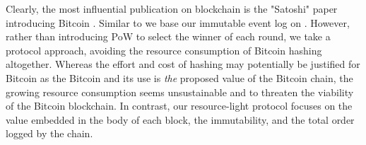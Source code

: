 \documentclass[10pt]{article}
\begin{document}

Clearly, the most influential publication on blockchain is the "Satoshi" paper introducing Bitcoin \cite{satoshi-paper}. Similar to \cite{satoshi-paper} we base our immutable event log on \cite{massias}. However, rather than introducing PoW to select the winner of each round, we take a protocol approach, avoiding the resource consumption of Bitcoin hashing altogether. Whereas the effort and cost of hashing may potentially be justified for Bitcoin as the Bitcoin and its use is \emph{the} proposed value of the Bitcoin chain, the growing resource consumption seems unsustainable and to threaten the viability of the Bitcoin blockchain. In contrast, our resource-light protocol focuses on the value embedded in the body of each block, the immutability, and the total order logged by the chain.


\end{document}
